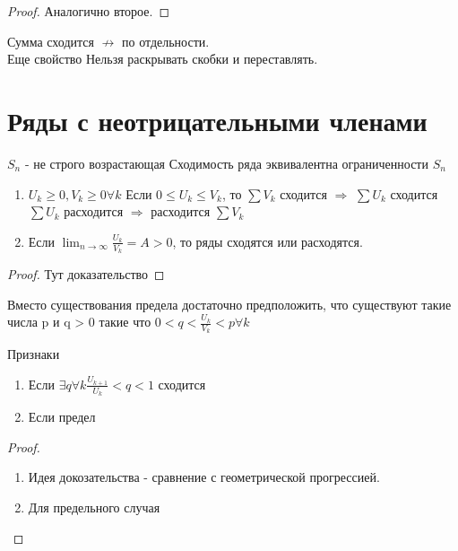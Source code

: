 \begin{proof}
  Аналогично второе.
\end{proof}

\begin{remark}
  Сумма сходится $\not \rightarrow$ по отдельности. \\
  Еще свойство
  Нельзя раскрывать скобки и переставлять.
\end{remark}

\section{Ряды с неотрицательными членами}

$S_n$ - не строго возрастающая
Сходимость ряда эквивалентна ограниченности $S_n$

\begin{theorem}
  \begin{enumerate}
    \item $U_k \geq 0, V_k \geq 0 \forall k$
      Если $0 \leq U_k \leq V_k$, то $\sum V_k$ сходится $\Rightarrow$
      $\sum U_k$ сходится
      $\sum U_k$ расходится $\Rightarrow$ расходится $\sum V_k$ \\
    \item Если $\lim_{n\to \infty} \frac{U_k}{V_k} = A > 0$, то ряды
      сходятся или расходятся.
  \end{enumerate}
\end{theorem}

\begin{proof}
  Тут доказательство
\end{proof}

\begin{remark}
  Вместо существования предела достаточно предположить, что существуют такие числа
  p и q > 0 такие что $0 < q < \frac{U_k}{V_k} < p \forall k$
\end{remark}

\begin{theorem}
  Признаки\\
  \begin{enumerate}
    \item Если $\exists q \forall k \frac{U_{k+1}}{U_k} < q < 1$ сходится
    \item Если предел
  \end{enumerate}
\end{theorem}

\begin{proof}
  \begin{enumerate}
    \item Идея докозательства - сравнение с геометрической прогрессией.
    \item Для предельного случая
  \end{enumerate}
\end{proof}

